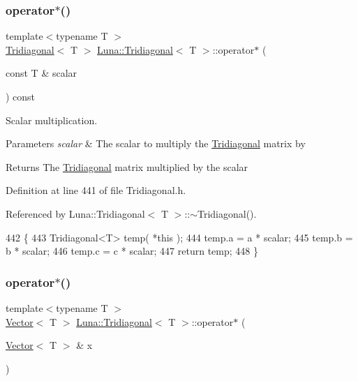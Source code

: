 \subsubsection{\texorpdfstring{operator$\ast$()}{operator*()}\hspace{0.1cm}{\footnotesize\ttfamily [1/2]}}
{\footnotesize\ttfamily template$<$typename T $>$ \\
\hyperlink{classLuna_1_1Tridiagonal}{Tridiagonal}$<$ T $>$ \hyperlink{classLuna_1_1Tridiagonal}{Luna\+::\+Tridiagonal}$<$ T $>$\+::operator$\ast$ (\begin{DoxyParamCaption}\item[{const T \&}]{scalar }\end{DoxyParamCaption}) const\hspace{0.3cm}{\ttfamily [inline]}}



Scalar multiplication. 


\begin{DoxyParams}{Parameters}
{\em scalar} & The scalar to multiply the \hyperlink{classLuna_1_1Tridiagonal}{Tridiagonal} matrix by \\
\hline
\end{DoxyParams}
\begin{DoxyReturn}{Returns}
The \hyperlink{classLuna_1_1Tridiagonal}{Tridiagonal} matrix multiplied by the scalar 
\end{DoxyReturn}


Definition at line 441 of file Tridiagonal.\+h.



Referenced by Luna\+::\+Tridiagonal$<$ T $>$\+::$\sim$\+Tridiagonal().


\begin{DoxyCode}
442   \{
443     Tridiagonal<T> temp( *\textcolor{keyword}{this} );
444     temp.a = a * scalar;
445     temp.b = b * scalar;
446     temp.c = c * scalar;
447     \textcolor{keywordflow}{return} temp;
448   \}
\end{DoxyCode}
\mbox{\label{classLuna_1_1Tridiagonal_a5262edb6caa8aac0186c480c3be2dcf2}} 
\subsubsection{\texorpdfstring{operator$\ast$()}{operator*()}\hspace{0.1cm}{\footnotesize\ttfamily [2/2]}}
{\footnotesize\ttfamily template$<$typename T $>$ \\
\hyperlink{classLuna_1_1Vector}{Vector}$<$ T $>$ \hyperlink{classLuna_1_1Tridiagonal}{Luna\+::\+Tridiagonal}$<$ T $>$\+::operator$\ast$ (\begin{DoxyParamCaption}\item[{\hyperlink{classLuna_1_1Vector}{Vector}$<$ T $>$ \&}]{x }\end{DoxyParamCaption})\hspace{0.3cm}{\ttfamily [inline]}}



